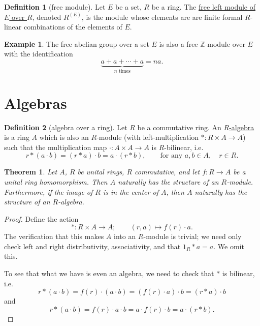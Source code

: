 \documentclass[a4paper]{report}
\newcommand{\Z}{\mathbb{Z}}
\newcommand{\defn}[1]{\ul{#1}}
\theoremstyle{definition}
\newtheorem{definition}{Definition}[section]
\newtheorem{example}{Example}[section]
\theoremstyle{plain}
\newtheorem{theorem}{Theorem}[section]
\theoremstyle{remark}
\begin{document}
\begin{definition}[free module]
  \label{def:freemodule}
  Let $E$ be a set, $R$ be a ring. The \defn{free left module of $E$ over $R$}, denoted $R^{(E)}$, is the module whose elements are are finite formal $R$-linear combinations of the elements of $E$.
\end{definition}

\begin{example}
  The free abelian group over a set $E$ is also a free $\Z$-module over $E$ with the identification
  \begin{equation*}
    \underbrace{a + a + \cdots + a}_{n\text{ times}} = na.
  \end{equation*}
\end{example}

\section{Algebras}
\begin{definition}[algebra over a ring]
  \label{def:algebraoveraring}
  Let $R$ be a commutative ring. An \defn{$R$-algebra} is a ring $A$ which is also an $R$-module (with left-multiplication $*\colon R \times A \to A$) such that the multiplication map $\cdot\colon A \times A \to A$ is $R$-bilinear, i.e. 
  \begin{equation*}
    r*(a\cdot b) = (r*a)\cdot b = a\cdot (r*b),\qquad\text{for any }a,b \in A,\quad r \in R.
  \end{equation*}
\end{definition}

\begin{theorem}
  \label{thm:ringhomomorphisminducesalgebra}
  Let $A$, $R$ be unital rings, $R$ commutative, and let $f\colon R \to A$ be a unital ring homomorphism. Then $A$ naturally has the structure of an $R$-module. Furthermore, if the image of $R$ is in the center of $A$, then $A$ naturally has the structure of an $R$-algebra.
\end{theorem}
\begin{proof}
  Define the action
  \begin{equation*}
    *\colon R \times A \to A;\qquad (r,a) \mapsto f(r)\cdot a.
  \end{equation*}
  The verification that this makes $A$ into an $R$-module is trivial; we need only check left and right distributivity, associativity, and that $1_{R}*a = a$. We omit this.

  To see that what we have is even an algebra, we need to check that $*$ is bilinear, i.e.
  \begin{equation*}
    r*(a\cdot b) = f(r)\cdot (a\cdot b) = (f(r)\cdot a)\cdot b = (r*a)\cdot b
  \end{equation*}
  and
  \begin{equation*}
    r*(a\cdot b) = f(r)\cdot a \cdot b = a \cdot f(r) \cdot b = a\cdot (r*b).
  \end{equation*}
\end{proof}
\end{document}
